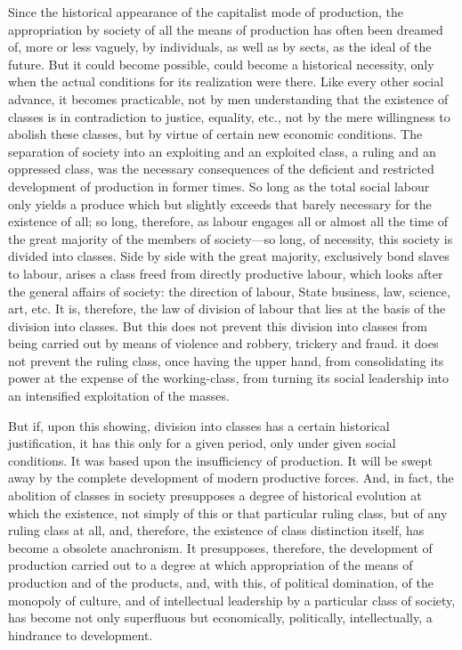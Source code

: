Since the historical appearance of the capitalist mode of production, the
appropriation by society of all the means of production has often been dreamed
of, more or less vaguely, by individuals, as well as by sects, as the ideal of
the future. But it could become possible, could become a historical necessity,
only when the actual conditions for its realization were there. Like every other
social advance, it becomes practicable, not by men understanding that the
existence of classes is in contradiction to justice, equality, etc., not by the
mere willingness to abolish these classes, but by virtue of certain new economic
conditions. The separation of society into an exploiting and an exploited class,
a ruling and an oppressed class, was the necessary consequences of the deficient
and restricted development of production in former times. So long as the total
social labour only yields a produce which but slightly exceeds that barely
necessary for the existence of all; so long, therefore, as labour engages all or
almost all the time of the great majority of the members of society---so long,
of necessity, this society is divided into classes. Side by side with the great
majority, exclusively bond slaves to labour, arises a class freed from directly
productive labour, which looks after the general affairs of society: the
direction of labour, State business, law, science, art, etc. It is, therefore,
the law of division of labour that lies at the basis of the division into
classes. But this does not prevent this division into classes from being
carried out by means of violence and robbery, trickery and fraud. it does not
prevent the ruling class, once having the upper hand, from consolidating its
power at the expense of the working-class, from turning its social leadership
into an intensified exploitation of the masses. 

But if, upon this showing, division into classes has a certain historical
justification, it has this only for a given period, only under given social
conditions. It was based upon the insufficiency of production. It will be swept
away by the complete development of modern productive forces. And, in fact, the
abolition of classes in society presupposes a degree of historical evolution at
which the existence, not simply of this or that particular ruling class, but of
any ruling class at all, and, therefore, the existence of class distinction
itself, has become a obsolete anachronism. It presupposes, therefore, the
development of production carried out to a degree at which appropriation of the
means of production and of the products, and, with this, of political
domination, of the monopoly of culture, and of intellectual leadership by a
particular class of society, has become not only superfluous but economically,
politically, intellectually, a hindrance to development. 

